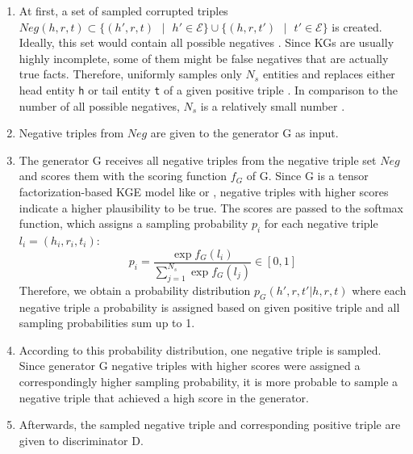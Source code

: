 \begin{enumerate}
    \item 
    At first, a set of sampled corrupted triples $Neg(h,r,t)\subset\{(h',r,t) \text{ } | \text{ } h' \in \mathcal{E}\} \cup \{(h,r,t') \text{ } | \text{ } t'\in\mathcal{E}\}$ is created.
    Ideally, this set would contain all possible negatives \cite{cai2017kbgan}.
    Since \acp{KG} are usually highly incomplete, some of them might be false negatives that are actually true facts.
    Therefore, \kbgan uniformly samples only $N_s$ entities and replaces either head entity \texttt{h} or tail entity \texttt{t} of a given positive triple .
    In comparison to the number of all possible negatives, $N_s$ is a relatively small number \cite{cai2017kbgan}.
    
    \item 
    Negative triples from $Neg$ are given to the generator G as input.
    
    \item 
    The generator G receives all negative triples from the negative triple set $Neg$ and scores them with the scoring function $f_G$ of G.
    Since G is a tensor factorization-based \ac{KGE} model like \distmult or \complex, negative triples with higher scores indicate a higher plausibility to be true.
    The scores are passed to the softmax function, which assigns a sampling probability $p_i$ for each negative triple $l_i = (h_i, r_i, t_i)$:
    \begin{equation} \label{eq:origsampling}
        p_i = \frac{\exp{f_G(l_i)}}{\sum_{j=1}^{N_s}{\exp{f_G(l_j)}}} \in [0,1]
    \end{equation}
    Therefore, we obtain a probability distribution $p_G(h',r,t'|h,r,t)$ where each negative triple  a probability is assigned based on given positive triple  and all sampling probabilities sum up to 1.
    
    \item
    According to this probability distribution, one negative triple is sampled.
    Since generator G negative triples with higher scores were assigned a correspondingly higher sampling probability, it is more probable to sample a negative triple that achieved a high score in the generator.

    \item 
    Afterwards, the sampled negative triple  and corresponding positive triple  are given to discriminator D.
    

\end{enumerate}
